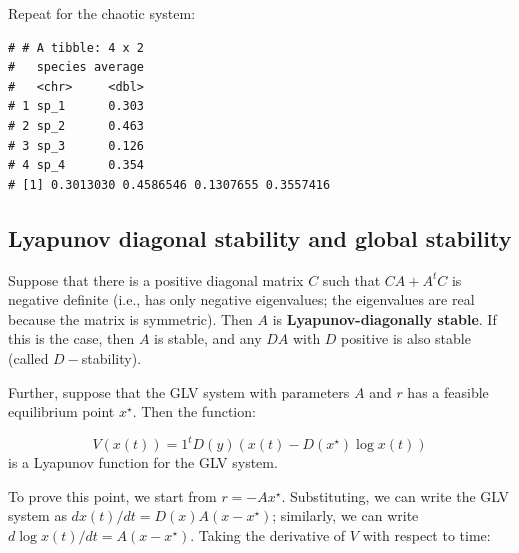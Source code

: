 \documentclass[]{book}
\newenvironment{Shaded}{\begin{snugshade}}{\end{snugshade}}
\newcommand{\CommentTok}[1]{\textcolor[rgb]{0.56,0.35,0.01}{\textit{#1}}}
\newcommand{\DataTypeTok}[1]{\textcolor[rgb]{0.13,0.29,0.53}{#1}}
\newcommand{\DecValTok}[1]{\textcolor[rgb]{0.00,0.00,0.81}{#1}}
\newcommand{\KeywordTok}[1]{\textcolor[rgb]{0.13,0.29,0.53}{\textbf{#1}}}
\newcommand{\NormalTok}[1]{#1}
\newcommand{\OperatorTok}[1]{\textcolor[rgb]{0.81,0.36,0.00}{\textbf{#1}}}
\newcommand{\StringTok}[1]{\textcolor[rgb]{0.31,0.60,0.02}{#1}}
\begin{document}
Repeat for the chaotic system:

\begin{Shaded}
\end{Shaded}

\begin{verbatim}
# # A tibble: 4 x 2
#   species average
#   <chr>     <dbl>
# 1 sp_1      0.303
# 2 sp_2      0.463
# 3 sp_3      0.126
# 4 sp_4      0.354
# [1] 0.3013030 0.4586546 0.1307655 0.3557416
\end{verbatim}

\hypertarget{lyapunov-diagonal-stability-and-global-stability}{%
\subsection{Lyapunov diagonal stability and global stability}\label{lyapunov-diagonal-stability-and-global-stability}}

Suppose that there is a positive diagonal matrix \(C\) such that \(C A + A^t C\) is negative definite (i.e., has only negative eigenvalues; the eigenvalues are real because the matrix is symmetric). Then \(A\) is \textbf{Lyapunov-diagonally stable}. If this is the case, then \(A\) is stable, and any \(D A\) with \(D\) positive is also stable (called \(D-\)stability).

Further, suppose that the GLV system with parameters \(A\) and \(r\) has a feasible equilibrium point \(x^\star\). Then the function:

\[
V(x(t)) = 1^t D(y) \left( x(t) -D(x^\star) \log x(t)\right)
\]
is a Lyapunov function for the GLV system.

To prove this point, we start from \(r = -Ax^\star\). Substituting, we can write the GLV system as \(dx(t)/dt = D(x)A(x - x^\star)\); similarly, we can write \(d \log x(t)/dt = A(x - x^\star)\). Taking the derivative of \(V\) with respect to time:
\end{document}
